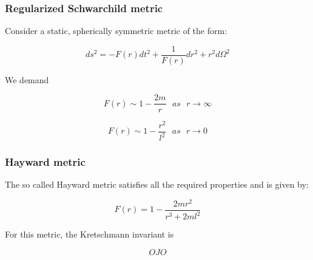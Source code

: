 \documentclass{beamer}
\begin{document}
\begin{frame}
\frametitle{Regularized Schwarchild metric}
Consider a static, spherically symmetric metric of the form:

\begin{equation}
ds^2 = -F(r)dt^2 + \frac{1}{F(r)}dr^2 + r^2d\Omega ^2
\end{equation}

We demand

\begin{equation}
F(r) \sim 1 - \frac{2m}{r}\ \ \ as\ \ \ r \rightarrow \infty
\end{equation}

\begin{equation}
F(r) \sim 1 - \frac{r^2}{l^2}\ \ \ as\ \ \ r \rightarrow 0
\end{equation}


\end{frame}


\begin{frame}
\frametitle{Hayward metric}
The so called Hayward metric \cite{hayward} satisfies all the required properties and is given by:

\begin{equation}
\label{hayw}
F(r) = 1 - \frac{2mr^2}{r^3 + 2ml^2}
\end{equation}

For this metric, the Kretschmann invariant is

\begin{equation}
OJO
\end{equation}






\end{frame}
\end{document}
